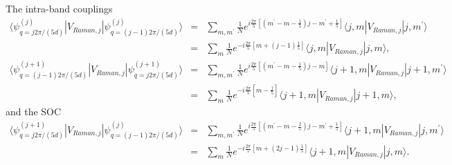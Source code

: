 \documentclass[twocolumn,prl,floatfix,citeautoscript,nofootinbib]{revtex4}
\begin{document}
The intra-band couplings
\begin{eqnarray}
\langle \psi _{q=j2\pi /(5d)}^{(j)}|V_{Raman,j}|\psi _{q=(j-1)2\pi
/(5d)}^{(j)}\rangle &=&\sum_{m,m^{\prime }}\frac{1}{N}e^{i\frac{2\pi }{5}%
\left[ (m^{\prime }-m-\frac{1}{5})j-m^{\prime }+\frac{1}{5}\right] }\langle
j,m|V_{Raman,j}|j,m^{\prime }\rangle \\
&=&\sum_{m}\frac{1}{N}e^{-i\frac{2\pi }{5}\left[ m+(j-1)\frac{1}{5}\right]
}\langle j,m|V_{Raman,j}|j,m\rangle ,  \nonumber \\
\langle \psi _{q=(j-1)2\pi /(5d)}^{(j+1)}|V_{Raman,j}|\psi _{q=j2\pi
/(5d)}^{(j+1)}\rangle &=&\sum_{m,m^{\prime }}\frac{1}{N}e^{i\frac{2\pi }{5}%
\left[ (m^{\prime }-m-\frac{1}{5})j-m\right] }\langle
j+1,m|V_{Raman,j}|j+1,m^{\prime }\rangle \\
&=&\sum_{m}\frac{1}{N}e^{-i\frac{2\pi }{5}\left[ m-\frac{j}{5}\right]
}\langle j+1,m|V_{Raman,j}|j+1,m\rangle ,  \nonumber
\end{eqnarray}%
and the SOC
\begin{eqnarray}
\langle \psi _{q=j2\pi /(5d)}^{(j+1)}|V_{Raman,j}|\psi _{q=(j-1)2\pi
/(5d)}^{(j)}\rangle &=&\sum_{m,m^{\prime }}\frac{1}{N}e^{i\frac{2\pi }{5}%
\left[ (m^{\prime }-m-\frac{2}{5})j-m^{\prime }+\frac{1}{5}\right] }\langle
j+1,m|V_{Raman,j}|j,m^{\prime }\rangle  \label{SOCGen} \\
&=&\sum_{m}\frac{1}{N}e^{-i\frac{2\pi }{5}\left[ m+(2j-1)\frac{1}{5}\right]
}\langle j+1,m|V_{Raman,j}|j,m\rangle .  \nonumber
\end{eqnarray}
\end{document}
